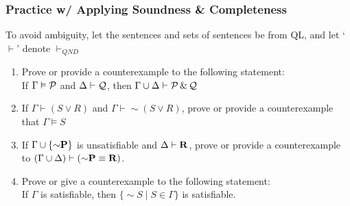 \begin{frame}
\frametitle{Practice w/ Applying Soundness \& Completeness}

To avoid ambiguity, let the sentences and sets of sentences be from QL, and let `$\vdash$' denote $\vdash_{QND}$

\begin{enumerate}[<+->]

\item Prove or provide a counterexample to the following statement: \\ If $\Gamma \vDash \mathcal{P}$ and $\Delta \vdash \mathcal{Q}$, then  $\Gamma \cup \Delta \vdash \mathcal{P} \,\&\, \mathcal{Q}$


\item If $\Gamma \vdash (S \lor R)$ and $\Gamma \vdash \sim (S \lor R)$, prove or provide a counterexample that $\Gamma \vDash S$


\item If $\Gamma \cup \{ \enot \BM{P} \}$ is unsatisfiable and $\Delta \vdash \mathbf{R}$, prove or provide a counterexample to $(\Gamma \cup\Delta) \vdash (\sim\BM{P} \equiv \BM{R}) $.

\item Prove or give a counterexample to the following statement: \\ If $\Gamma$ is satisfiable, then $\{\sim S \mid S \in \Gamma\} $ is satisfiable.

\end{enumerate}
\end{frame}

